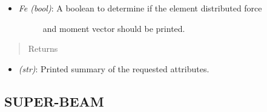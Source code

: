 \documentclass[letterpaper,10pt,english]{sphinxmanual}
\begin{document}
\begin{fulllineitems}
\begin{fulllineitems}
\begin{itemize}
\begin{description}
\end{description}

\item {} \begin{description}
\item[{\emph{Fe (bool)}: A boolean to determine if the element distributed force}] \leavevmode
and moment vector should be printed.

\end{description}

\end{itemize}
\begin{quote}\begin{description}
\item[{Returns}] \leavevmode
\end{description}\end{quote}
\begin{itemize}
\item {} 
\emph{(str)}: Printed summary of the requested attributes.

\end{itemize}

\end{fulllineitems}


\end{fulllineitems}



\subsection{SUPER-BEAM}
\label{structures:super-beam}
\end{document}
